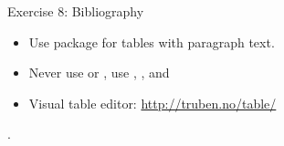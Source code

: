 \documentclass[10pt,times]{beamer}
\begin{document}
\begin{frame}[fragile]{Exercise 8: Bibliography}

\begin{center}
\end{center}

\begin{itemize}
\item Use  package for tables with paragraph text.

\item Never use  or , use , 
,  and 

\item Visual table editor: 
\href{http://truben.no/table/}{http://truben.no/table/}
\end{itemize}

\begin{center}
%
.
\end{center}

\end{frame}
\end{document}
